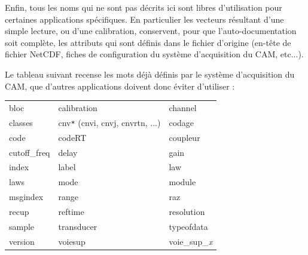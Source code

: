   Enfin, tous les noms qui ne sont pas décrits ici sont libres d'utilisation
pour certaines applications spécifiques. En particulier les vecteurs résultant
d'une simple lecture, ou d'une calibration, conservent, pour que
l'auto-documentation soit complète, les attributs qui sont définis dans le
fichier d'origine (en-tête de fichier NetCDF, fiches de configuration du
système d'acquisition du CAM, etc...).

  Le tableau suivant recense les mots déjà définis par le système
d'acquisition du CAM, que d'autres applications doivent donc éviter
d'utiliser : \\

  \begin{tabular}{p{5cm}p{5cm}p{5cm}}
      bloc                 & calibration                 & channel      \\
      classes\footnotemark[1]
                           & cnv\texttt{*} (cnvi, cnvj, cnvrtn, ...) & codage \\
      code                 & codeRT                      & coupleur     \\
      cutoff\_freq         & delay                       & gain         \\
      index                & label                       & law          \\
      laws                 & mode                        & module       \\
      msgindex             & range\footnotemark[2]
                                                         & raz          \\
      recup                & reftime\footnotemark[3]     & resolution   \\
      sample\footnotemark[4]
                           & transducer                  & typeofdata   \\
      version              & voiesup\footnotemark[1]     & voie\_sup\_\textit{x}\\
  \end{tabular}


